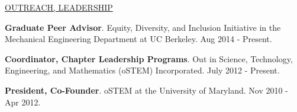 \documentclass[12pt,letterpaper]{deedy-resume} %
\begin{document}
\raggedright{
\quad \underline{OUTREACH, LEADERSHIP}\\

\begin{tightitemize}

\item \textbf{Graduate Peer Advisor}. Equity, Diversity, and Inclusion Initiative in the Mechanical Engineering Department at UC Berkeley. Aug 2014 - Present.

\item \textbf{Coordinator, Chapter Leadership Programs}. Out in Science, Technology, Engineering, and Mathematics (oSTEM) Incorporated. July 2012 - Present.

\item \textbf{President, Co-Founder}. oSTEM at the University of Maryland. Nov 2010 - Apr 2012.

\end{tightitemize}
}
\newpage %
\thispagestyle{empty}
\end{document}

